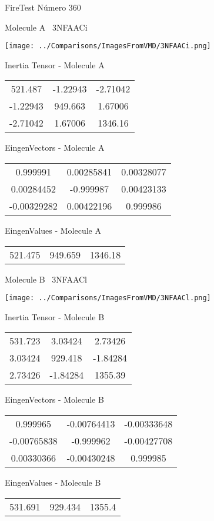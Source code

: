 \vtab[-3cm]
\begin{center}
{\large FireTest \tab Número 360}
\end{center}
\begin{multicols}{2}
\begin{center}

Molecule A \
3NFAACi

\texttt{[image: ../Comparisons/ImagesFromVMD/3NFAACi.png]}

Inertia Tensor - Molecule A \\
\begin{tabular}{|c c c|}
521.487	 & 	-1.22943	 & 	-2.71042	 \\
-1.22943	 & 	949.663	 & 	1.67006	 \\
-2.71042	 & 	1.67006	 & 	1346.16
\end{tabular}

\vtab
 EingenVectors - Molecule A     \\
\begin{tabular}{|c c c|}
0.999991	 & 	0.00285841	 & 	0.00328077	 \\
0.00284452	 & 	-0.999987	 & 	0.00423133	 \\
-0.00329282	 & 	0.00422196	 & 	0.999986
\end{tabular}

\vtab
 EingenValues - Molecule A     \\
\begin{tabular}{|c c c|}
521.475	 & 	949.659	 & 	1346.18	 \\
\end{tabular}
\columnbreak

Molecule B \
3NFAACl

\texttt{[image: ../Comparisons/ImagesFromVMD/3NFAACl.png]}

Inertia Tensor - Molecule B \\
\begin{tabular}{|c c c|}
531.723	 & 	3.03424	 & 	2.73426	 \\
3.03424	 & 	929.418	 & 	-1.84284	 \\
2.73426	 & 	-1.84284	 & 	1355.39
\end{tabular}

\vtab
 EingenVectors - Molecule B     \\
\begin{tabular}{|c c c|}
0.999965	 & 	-0.00764413	 & 	-0.00333648	 \\
-0.00765838	 & 	-0.999962	 & 	-0.00427708	 \\
0.00330366	 & 	-0.00430248	 & 	0.999985
\end{tabular}

\vtab
 EingenValues - Molecule B     \\
\begin{tabular}{|c c c|}
531.691	 & 	929.434	 & 	1355.4	 \\
\end{tabular}

\end{center}
\end{multicols}

